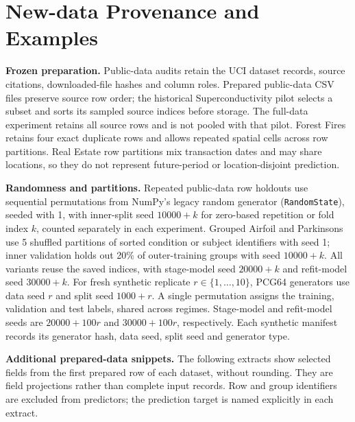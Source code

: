 \section{New-data Provenance and Examples}
\label{app:new-data-provenance}

\textbf{Frozen preparation.}
Public-data audits retain the UCI dataset records, source citations, downloaded-file hashes and column roles.
Prepared public-data CSV files preserve source row order; the historical Superconductivity pilot selects a subset and sorts its sampled source indices before storage.
The full-data experiment retains all source rows and is not pooled with that pilot.
Forest Fires retains four exact duplicate rows and allows repeated spatial cells across row partitions.
Real Estate row partitions mix transaction dates and may share locations, so they do not represent future-period or location-disjoint prediction.

\textbf{Randomness and partitions.}
Repeated public-data row holdouts use sequential permutations from NumPy's legacy random generator (\texttt{RandomState}), seeded with 1, with inner-split seed $10000+k$ for zero-based repetition or fold index $k$, counted separately in each experiment.
Grouped Airfoil and Parkinsons use 5 shuffled partitions of sorted condition or subject identifiers with seed 1; inner validation holds out 20\% of outer-training groups with seed $10000+k$.
All variants reuse the saved indices, with stage-model seed $20000+k$ and refit-model seed $30000+k$.
For fresh synthetic replicate $r\in\{1,\ldots,10\}$, PCG64 generators use data seed $r$ and split seed $1000+r$.
A single permutation assigns the training, validation and test labels, shared across regimes.
Stage-model and refit-model seeds are $20000+100r$ and $30000+100r$, respectively.
Each synthetic manifest records its generator hash, data seed, split seed and generator type.

\textbf{Additional prepared-data snippets.}
The following extracts show selected fields from the first prepared row of each dataset, without rounding.
They are field projections rather than complete input records.
Row and group identifiers are excluded from predictors; the prediction target is named explicitly in each extract.

